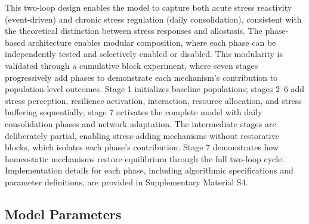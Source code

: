 \documentclass[
  letterpaper,
  DIV=11,
  numbers=noendperiod]{scrartcl}
\begin{document}
This two-loop design enables the model to capture both acute stress
reactivity (event-driven) and chronic stress regulation (daily
consolidation), consistent with the theoretical distinction between
stress responses and allostasis. The phase-based architecture enables
modular composition, where each phase can be independently tested and
selectively enabled or disabled. This modularity is validated through a
cumulative block experiment, where seven stages progressively add phases
to demonstrate each mechanism's contribution to population-level
outcomes. Stage 1 initializes baseline populations; stages 2--6 add
stress perception, resilience activation, interaction, resource
allocation, and stress buffering sequentially; stage 7 activates the
complete model with daily consolidation phases and network adaptation.
The intermediate stages are deliberately partial, enabling stress-adding
mechanisms without restorative blocks, which isolates each phase's
contribution. Stage 7 demonstrates how homeostatic mechanisms restore
equilibrium through the full two-loop cycle. Implementation details for
each phase, including algorithmic specifications and parameter
definitions, are provided in Supplementary Material S4.

\subsection{Model Parameters}\label{model-parameters}

\setlength\LTleft{0pt}
\setlength\LTright{0pt}
\end{document}
